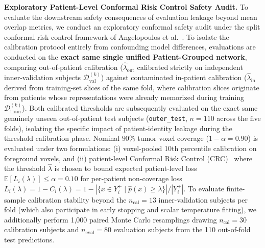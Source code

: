 \documentclass[11pt,a4paper]{article}
\begin{document}
\noindent\textbf{Exploratory Patient-Level Conformal Risk Control Safety Audit.}
To evaluate the downstream safety consequences of evaluation leakage beyond mean overlap metrics, we conduct an exploratory conformal safety audit under the split conformal risk control framework of Angelopoulos et al.~\cite{angelopoulos2024conformal}. To isolate the calibration protocol entirely from confounding model differences, evaluations are conducted on the \textbf{exact same single unified Patient-Grouped network}, comparing out-of-patient calibration ($\hat{\lambda}_{\text{out}}$ calibrated strictly on independent inner-validation subjects $\mathcal{D}_{\text{val}}^{(k)}$) against contaminated in-patient calibration ($\hat{\lambda}_{\text{in}}$ derived from training-set slices of the same fold, where calibration slices originate from patients whose representations were already memorized during training $\mathcal{D}_{\text{train}}^{(k)}$). Both calibrated thresholds are subsequently evaluated on the exact same genuinely unseen out-of-patient test subjects (\texttt{outer\_test}, $n=110$ across the five folds), isolating the specific impact of patient-identity leakage during the threshold calibration phase. Nominal $90\%$ tumor voxel coverage ($1 - \alpha = 0.90$) is evaluated under two formulations: (i) voxel-pooled 10th percentile calibration on foreground voxels, and (ii) patient-level Conformal Risk Control (CRC)~\cite{angelopoulos2024conformal} where the threshold $\hat{\lambda}$ is chosen to bound expected patient-level loss $\mathbb{E}[L_i(\lambda)] \le \alpha = 0.10$ for per-patient non-coverage loss $L_i(\lambda) = 1 - C_i(\lambda) = 1 - |\{x \in Y_i^+ \mid \hat{p}(x) \ge \lambda\}| / |Y_i^+|$. To evaluate finite-sample calibration stability beyond the $n_{\text{cal}} = 13$ inner-validation subjects per fold (which also participate in early stopping and scalar temperature fitting), we additionally perform 1,000 paired Monte Carlo resamplings drawing $n_{\text{cal}} = 30$ calibration subjects and $n_{\text{eval}} = 80$ evaluation subjects from the 110 out-of-fold test predictions.
\end{document}
